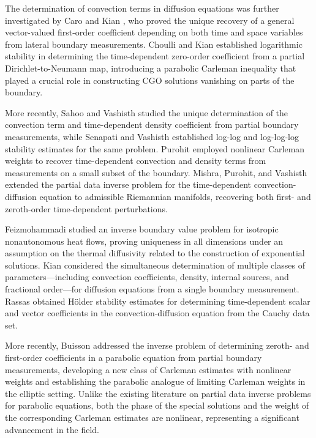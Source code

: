 \documentclass[10pt,a4paper]{amsart}
\theoremstyle{remark}
\theoremstyle{definition}
\begin{document}
The determination of convection terms in diffusion equations was further investigated
by Caro and Kian \cite{arXiv:1812.08495}, who proved the unique recovery of a general vector-valued
first-order coefficient depending on both time and space variables
from lateral boundary measurements. Choulli and Kian \cite{zbMATH06869653} established logarithmic stability in determining the time-dependent zero-order coefficient from a partial Dirichlet-to-Neumann map, introducing a parabolic Carleman inequality that played a crucial role in constructing CGO solutions vanishing on parts of the boundary.

More recently, Sahoo and Vashisth \cite{zbMATH07170240} studied the unique determination of the convection term and time-dependent density coefficient from partial boundary measurements, while Senapati and Vashisth \cite{zbMATH07597186} established log-log and log-log-log stability estimates for the same problem. Purohit \cite{zbMATH08020896} employed nonlinear Carleman weights to recover time-dependent convection and density terms from measurements on a small subset of the boundary. Mishra, Purohit, and Vashisth \cite{zbMATH08109740} extended the partial data inverse problem for the time-dependent convection-diffusion equation to admissible Riemannian manifolds, recovering both first- and zeroth-order time-dependent perturbations.

Feizmohammadi \cite{zbMATH07802400} studied an inverse boundary value problem for isotropic nonautonomous heat flows, proving uniqueness in all dimensions under an assumption on the thermal diffusivity related to the construction of exponential solutions. Kian \cite{zbMATH07543698} considered the simultaneous determination of multiple classes of parameters---including convection coefficients, density, internal sources, and fractional order---for diffusion equations from a single boundary measurement. Rassas \cite{zbMATH07829439} obtained H\"older stability estimates for determining time-dependent scalar and vector coefficients in the convection-diffusion equation from the Cauchy data set.

More recently, Buisson \cite{arXiv:2607.13778} addressed the inverse problem of determining zeroth- and first-order coefficients in a parabolic equation from partial boundary measurements, developing a new class of Carleman estimates with nonlinear weights and establishing the parabolic analogue of limiting Carleman weights in the elliptic setting. Unlike the existing literature on partial data inverse problems for parabolic equations, both the phase of the special solutions and the weight of the corresponding Carleman estimates are nonlinear, representing a significant advancement in the field.
\end{document}

